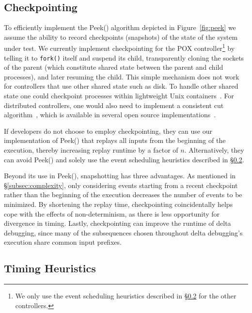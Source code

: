 \subsection{Checkpointing}
\label{subsec:snapshotting}

To efficiently implement the {\sc Peek()} algorithm depicted in
Figure~\ref{fig:peek} we assume the ability to record checkpoints (snapshots) of the state of the
system under test. We currently implement checkpointing for the POX
controller\footnote{We only use the event scheduling heuristics described in
\S\ref{subsec:timing_heuristics} for the other controllers.} by telling it to \verb=fork()= itself and suspend its child,
transparently cloning the sockets of the parent
(which constitute shared state between the parent and child processes),
and later resuming the child. This simple mechanism does
not work for controllers that use other shared state such as disk.
To handle other shared state one could checkpoint processes within
lightweight Unix containers~\cite{lxc}. For distributed controllers, one
would also need to implement a consistent cut
algorithm~\cite{Chandy:1985:DSD:214451.214456}, which is available in several open source
implementations~\cite{ansel2009dmtcp}.

If developers do not choose to employ checkpointing,
they can use our implementation of {\sc Peek()} that replays all inputs from
the beginning of the execution, thereby increasing replay runtime by
a factor of $n$. Alternatively, they can
avoid {\sc Peek()} and solely use the event scheduling heuristics described in \S\ref{subsec:timing_heuristics}.

Beyond its use in {\sc Peek()}, snapshotting has three advantages.
As mentioned in \S\ref{subsec:complexity}, only considering events starting
from a recent checkpoint rather than the beginning of the execution decreases the number of events to
be minimized. By shortening the replay time, checkpointing coincidentally helps cope
with the effects of non-determinism, as there is less opportunity for
divergence in timing. Lastly, checkpointing can improve the runtime of delta
debugging, since many of the subsequences chosen throughout delta debugging's
execution share common input prefixes.

\subsection{Timing Heuristics}
\label{subsec:timing_heuristics}


